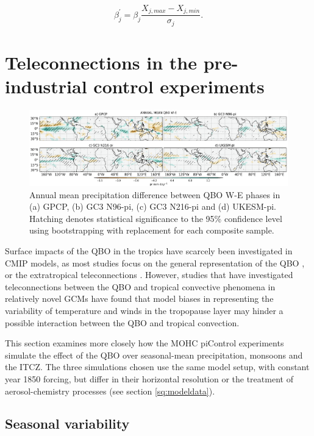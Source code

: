 \begin{equation}
\beta_j^\prime=\beta_j\frac{X_{j,max}-X_{j,min}}{\sigma_j}.
\end{equation}
\section{Teleconnections in the pre-industrial control experiments}\label{sq:cmip6_qbo}

\begin{figure}[b!]
\centering
 \includegraphics[width=\linewidth]{figures/piprclimqbowqboe.png}
\caption[Annual mean precipitation composite difference QBO W-E ]{ Annual mean precipitation difference between QBO W-E phases in (a) GPCP, (b) GC3 N96-pi, (c) GC3 N216-pi and (d) UKESM-pi. Hatching denotes statistical significance to the 95\% confidence level using bootstrapping with replacement for each composite sample. }
\label{fig:qboclim}
\end{figure}

Surface impacts of the QBO in the tropics have scarcely been investigated in CMIP models, as most studies focus on the general representation of the QBO \citep[e.g][]{schenzinger2017,bushell2020}, or the extratropical teleconnections \citep[e.g.][]{anstey2021,dimdore2021}. 
However, studies that have investigated teleconnections between the QBO and tropical convective phenomena in relatively novel GCMs \citep[e.g.][]{lee2018,martin2021,serva2021} have found that model biases in representing the variability of temperature and winds in the tropopause layer may hinder a possible interaction between the QBO and tropical convection. 

This section examines more closely how the MOHC piControl experiments simulate the effect of the QBO over seasonal-mean precipitation, monsoons and the ITCZ. 
The three simulations chosen use the same model setup, with constant year 1850 forcing, but differ in their horizontal resolution or the treatment of aerosol-chemistry processes (see section \ref{sq:modeldata}). 


\subsection{Seasonal variability}

